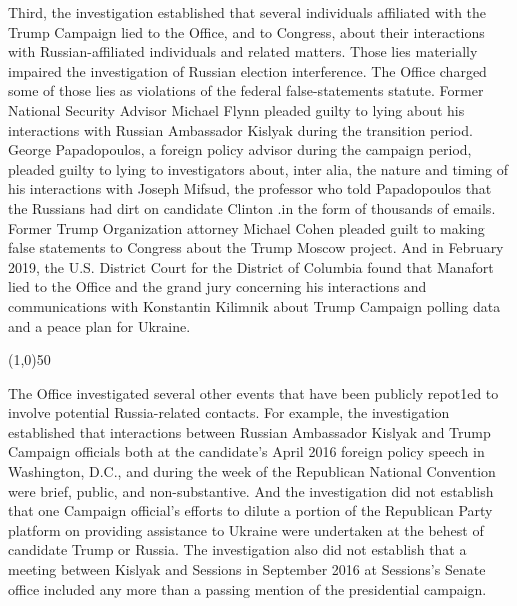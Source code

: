 \documentclass{article}
\newcommand{\hr}{\begin{center} \line(1,0){50} \end{center}}
\begin{document}
Third, the investigation established that several individuals affiliated with the Trump Campaign lied to the Office, and to Congress, about their interactions with Russian-affiliated individuals and related matters. Those lies materially impaired the investigation of Russian election interference. The Office charged some of those lies as violations of the federal false-statements statute. Former National Security Advisor Michael Flynn pleaded guilty to lying about his interactions with Russian Ambassador Kislyak during the transition period. George Papadopoulos, a  foreign policy advisor during the campaign period,  pleaded guilty to lying to investigators about, inter alia, the nature and timing of his interactions with Joseph Mifsud, the professor who told Papadopoulos that the Russians had dirt on candidate Clinton .in the form of thousands of emails. Former Trump Organization attorney Michael Cohen pleaded guilt to making false statements to Congress about the Trump Moscow project.
And in February 2019, the U.S. District Court for the District of Columbia found that Manafort lied to the Office and the grand jury concerning his interactions and communications with Konstantin Kilimnik about Trump Campaign polling data and a peace plan for Ukraine.

\hr

The Office investigated several other events that have been publicly repot1ed to involve potential Russia-related contacts. For example, the investigation established that interactions between Russian Ambassador Kislyak and Trump Campaign officials both at the candidate's April 2016 foreign policy speech in Washington, D.C., and during the week of the Republican National Convention were brief, public, and non-substantive. And the investigation did not establish that one Campaign official's efforts to dilute a portion of the Republican Party platform on providing assistance to Ukraine were undertaken at the behest of candidate Trump or Russia. The investigation also did not establish that a  meeting between Kislyak and Sessions in September 2016 at Sessions's Senate office included any more than a  passing mention of the presidential campaign.
\end{document}
